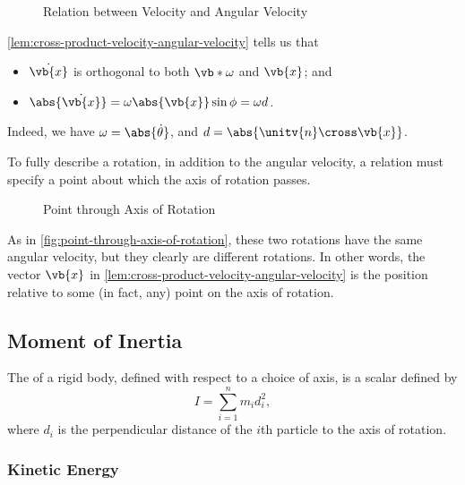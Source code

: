 \begin{figure}[ht!]
    \centering
    \caption{Relation between Velocity and Angular Velocity}
    \label{fig:angular-velocity-velocity}%
\end{figure}

\autoref{lem:cross-product-velocity-angular-velocity} tells us that
\begin{itemize}
    \item \(\dot{\vb{x}}\) is orthogonal to both \(\vb*{\omega}\) and \(\vb{x}\); and
    \item \(\abs{\dot{\vb{x}}} = \omega \abs{\vb{x}} \sin \phi = \omega d\).
\end{itemize}

Indeed, we have \(\omega = \abs{\dot{\theta}}\), and \(d = \abs{\unitv{n} \cross \vb{x}}\).

To fully describe a rotation, in addition to the angular velocity, a relation must specify a point about which the axis of rotation passes.

\begin{figure}[ht!]
    \centering
    \caption{Point through Axis of Rotation}
    \label{fig:point-through-axis-of-rotation}%
\end{figure}

As in \autoref{fig:point-through-axis-of-rotation}, these two rotations have the same angular velocity, but they clearly are different rotations. In other words, the vector \(\vb{x}\) in \autoref{lem:cross-product-velocity-angular-velocity} is the position relative to some (in fact, any) point on the axis of rotation.

\subsection{Moment of Inertia}

\begin{definition}
    \label{def:moment-of-inertia}%
    The  of a rigid body, defined with respect to a choice of axis, is a scalar defined by
    \begin{equation}
        \boxed{I = \sum_{i = 1}^{n} m_i d_i^2,}
    \end{equation}
    where \(d_i\) is the perpendicular distance of the \(i\)th particle to the axis of rotation.
\end{definition}

\subsubsection{Kinetic Energy}

